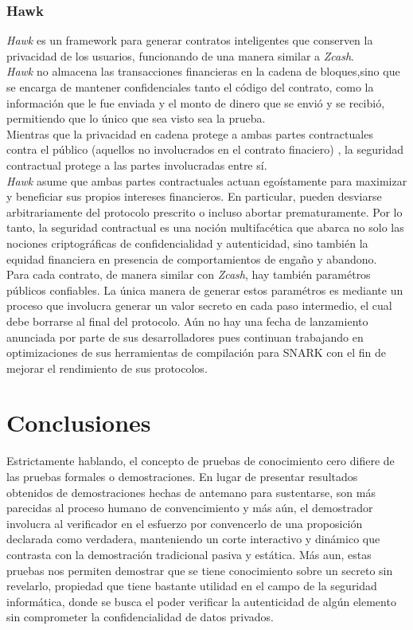 \documentclass[oneside,10pt]{article}
\begin{document}
\subsubsection{Hawk}
\emph{Hawk} es un framework para generar contratos inteligentes que conserven la privacidad de los usuarios, funcionando de una manera similar a \emph{Zcash}. \\
\emph{Hawk} no almacena las transacciones financieras en la cadena de bloques,sino que se encarga de mantener confidenciales tanto el código del contrato, como la información que le fue enviada y el monto de dinero que se envió y se recibió, permitiendo que lo único que sea visto sea la prueba. \\
Mientras que la privacidad en cadena protege a ambas partes contractuales contra el público (aquellos no involucrados en el contrato finaciero) , la seguridad contractual protege a las partes involucradas entre sí.\\
\emph{Hawk} asume que ambas partes contractuales actuan egoístamente para maximizar y beneficiar sus propios intereses financieros. En particular, pueden desviarse arbitrariamente del protocolo prescrito o incluso abortar prematuramente. Por lo tanto, la seguridad contractual es una noción multifacética que abarca no solo las nociones criptográficas de confidencialidad y autenticidad, sino también la equidad financiera en presencia de comportamientos de engaño y abandono. \\
Para cada contrato, de manera similar con \emph{Zcash}, hay también paramétros públicos confiables. La única manera de generar estos paramétros es mediante un proceso que involucra generar un valor secreto en cada paso intermedio, el cual debe borrarse al final del protocolo. 
Aún no hay una fecha de lanzamiento anunciada por parte de sus desarrolladores pues continuan trabajando en optimizaciones de sus herramientas de compilación para SNARK con el fin de mejorar el rendimiento de sus protocolos.
\section{Conclusiones}
Estrictamente hablando, el concepto de  pruebas de conocimiento cero difiere de las pruebas formales o demostraciones. En lugar de presentar resultados obtenidos de demostraciones hechas de antemano para sustentarse, son más parecidas al proceso humano de convencimiento y más aún, el demostrador involucra al verificador en el esfuerzo por convencerlo de una proposición declarada como verdadera, manteniendo un corte interactivo y dinámico que contrasta con la demostración tradicional pasiva y estática. Más aun, estas pruebas nos permiten demostrar que se tiene conocimiento sobre un secreto sin revelarlo, propiedad que tiene bastante utilidad en el campo de la seguridad informática, donde se busca el poder verificar la autenticidad de algún elemento sin comprometer la confidencialidad de datos privados. \\
\end{document}
